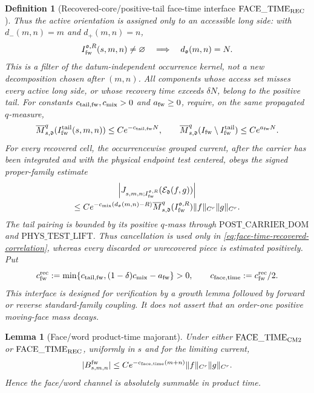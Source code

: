 \documentclass[11pt]{article}
\newtheorem{lemma}[theorem]{Lemma}
\newtheorem{definition}[theorem]{Definition}
\begin{document}
\begin{definition}[Recovered-core/positive-tail face-time interface
$\mathrm{FACE\_TIME}_{\rm REC}$]
Thus the active orientation is assigned only to an accessible long side:
with $d_-(m,n)=m$ and $d_+(m,n)=n$,
\begin{equation}
\label{eq:face-time-long-side-record}
 I_{\rm fw}^{\mathfrak o,R}(s,m,n)\ne\varnothing
 \quad\Longrightarrow\quad d_{\mathfrak o}(m,n)=N.
\end{equation}
This is a filter of the datum-independent occurrence kernel, not a new
decomposition chosen after $(m,n)$.  All components whose access
set misses every active long side, or whose recovery time exceeds
$\delta N$, belong to the positive tail.  For constants
$c_{\rm tail,fw},c_{\rm mix}>0$ and
$a_{\rm fw}\ge0$, require, on the same propagated $q$-measure,
\begin{equation}
\label{eq:face-time-recovery-tail}
 \overline M_{s,\mathfrak d}^{q}(I_{\rm fw}^{\rm tail}(s,m,n))
 \le C e^{-c_{\rm tail,fw}N},
 \qquad
 \overline M_{s,\mathfrak d}^{q}(I_{\rm fw}\setminus
 I_{\rm fw}^{\rm tail})\le Ce^{a_{\rm fw}N}.
\end{equation}
For every recovered cell, the occurrencewise grouped current, after the
carrier has been integrated and with the physical endpoint test centered,
obeys the signed proper-family estimate
\begin{multline}
\label{eq:face-time-recovered-correlation}
 \left|J_{s,m,n;I_{\rm fw}^{\mathfrak o,R}}
       (\mathcal E_{\mathfrak d}(f,g))\right|\\
 \le C e^{-c_{\rm mix}(d_{\mathfrak o}(m,n)-R)}
 \overline M_{s,\mathfrak d}^{q}
       (I_{\rm fw}^{\mathfrak o,R})
 \|f\|_{C^r}\|g\|_{C^r}.
\end{multline}
The tail pairing is bounded by its positive $q$-mass through
$\mathrm{POST\_CARRIER\_DOM}$ and
$\mathrm{PHYS\_TEST\_LIFT}$.  Thus cancellation is used only in
\eqref{eq:face-time-recovered-correlation}, whereas every discarded or
unrecovered piece is estimated positively.  Put
\begin{equation}
\label{eq:face-time-recovered-rate}
 c_{\rm fw}^{\rm rec}:=
 \min\{c_{\rm tail,fw},(1-\delta)c_{\rm mix}-a_{\rm fw}\}>0,
 \qquad c_{\rm face,time}:=c_{\rm fw}^{\rm rec}/2.
\end{equation}
This interface is designed for verification by a growth lemma followed by
forward or reverse standard-family coupling.  It does not assert that an
order-one positive moving-face mass decays.
\end{definition}

\begin{lemma}[Face/word product-time majorant]
\label{lem:face-time-majorant}
Under either $\mathrm{FACE\_TIME}_{\rm CM2}$ or
$\mathrm{FACE\_TIME}_{\rm REC}$, uniformly in $s$ and for the limiting
current,
\begin{equation}
\label{eq:face-time-CM2-majorant}
 |B_{s,m,n}^{\rm fw}|
 \le C e^{-c_{\rm face,time}(m+n)}
 \|f\|_{C^r}\|g\|_{C^r}.
\end{equation}
Hence the face/word channel is absolutely summable in product time.
\end{lemma}
\end{document}
